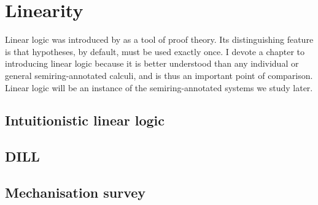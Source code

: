 \chapter{Linearity}\label{sec:linearity}

Linear logic was introduced by \citet{girard87linear} as a tool of proof theory.
Its distinguishing feature is that hypotheses, by default, must be used exactly
once.
I devote a chapter to introducing linear logic because it is better understood
than any individual or general semiring-annotated calculi, and is thus an
important point of comparison.
Linear logic will be an instance of the semiring-annotated systems we study
later.

\section{Intuitionistic linear logic}\label{sec:ill}


\section{DILL}\label{sec:dill}


\section{Mechanisation survey}


